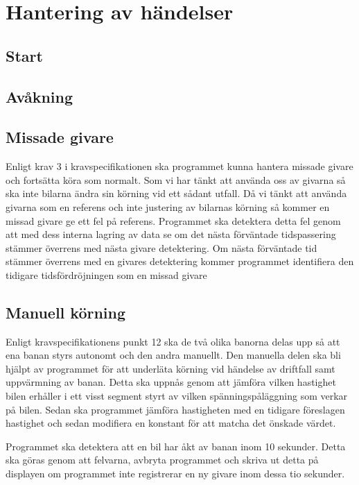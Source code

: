 \section{Hantering av händelser}


\subsection{Start}

\subsection{Avåkning}


\subsection{Missade givare}

Enligt krav 3 i kravspecifikationen ska programmet kunna hantera missade givare och fortsätta köra som normalt. Som vi har tänkt att använda oss av givarna så ska inte bilarna ändra sin körning vid ett sådant utfall. Då vi tänkt att använda givarna som en referens och inte justering av bilarnas körning så kommer en missad givare ge ett fel på referens. Programmet ska detektera detta fel genom att med dess interna lagring av data se om det nästa förväntade tidspassering stämmer överrens med nästa givare detektering. Om nästa förväntade tid stämmer överrens med en givares detektering kommer programmet identifiera den tidigare tidsfördröjningen som en missad givare


\subsection{Manuell körning}
Enligt kravspecifikationens punkt 12 ska de två olika banorna delas upp så att ena banan styrs autonomt och den andra manuellt. 
Den manuella delen ska bli hjälpt av programmet för att underläta körning vid händelse av driftfall samt uppvärmning av banan.
Detta ska uppnås genom att jämföra vilken hastighet bilen erhåller i ett visst segment styrt av vilken spänningspåläggning som verkar på bilen.
Sedan ska programmet  jämföra hastigheten med en tidigare föreslagen hastighet och sedan modifiera en konstant för att matcha det önskade värdet.

Programmet ska detektera att en bil har åkt av banan inom 10 sekunder. Detta ska göras genom att felvarna, avbryta programmet och skriva ut detta på displayen om programmet inte registrerar en ny givare inom dessa tio sekunder.
